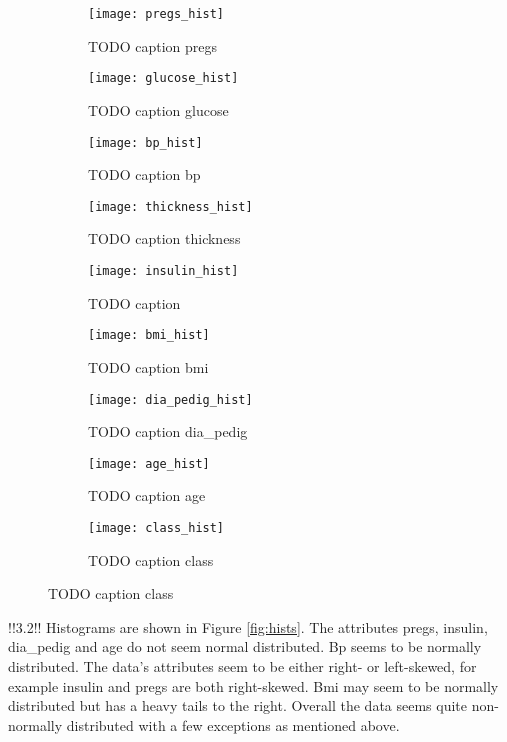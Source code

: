 \begin{figure}
  \centering{}
  \caption{TODO caption}\label{fig:hists}
  \begin{subfigure}{0.3\textwidth}
    \texttt{[image: pregs\_hist]}
    \caption{TODO caption pregs}
  \end{subfigure}
  \begin{subfigure}{0.3\textwidth}
    \texttt{[image: glucose\_hist]}
    \caption{TODO caption glucose}
  \end{subfigure}
  \begin{subfigure}{0.3\textwidth}
    \texttt{[image: bp\_hist]}
    \caption{TODO caption bp}
  \end{subfigure}

  \begin{subfigure}{0.3\textwidth}
    \texttt{[image: thickness\_hist]}
    \caption{TODO caption thickness}
  \end{subfigure}
  \begin{subfigure}{0.3\textwidth}
    \texttt{[image: insulin\_hist]}
    \caption{TODO caption }
  \end{subfigure}
  \begin{subfigure}{0.3\textwidth}
    \texttt{[image: bmi\_hist]}
    \caption{TODO caption bmi}
  \end{subfigure}

  \begin{subfigure}{0.3\textwidth}
    \texttt{[image: dia\_pedig\_hist]}
    \caption{TODO caption dia\_pedig}
  \end{subfigure}
  \begin{subfigure}{0.3\textwidth}
    \texttt{[image: age\_hist]}
    \caption{TODO caption age}
  \end{subfigure}
  \begin{subfigure}{0.3\textwidth}
    \texttt{[image: class\_hist]}
    \caption{TODO caption class}
  \end{subfigure}
\end{figure}

!!3.2!!
Histograms are shown in Figure \ref{fig:hists}. The attributes pregs, insulin, dia\_pedig
and age do not seem normal distributed. Bp seems to be normally distributed.
The data's attributes seem to be either right- or left-skewed, for example insulin and pregs
are both right-skewed. Bmi may seem to be normally distributed but has a
heavy tails to the right.
Overall the data seems quite non-normally distributed with a few exceptions as mentioned above.


